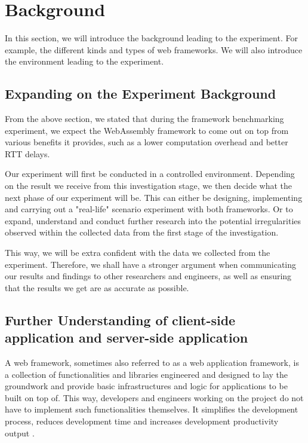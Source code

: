 \chapter{Background} \label{chap:background}

In this section, we will introduce the background leading to the experiment. For example, the different kinds and types of web frameworks. We will also introduce the environment leading to the experiment.

\section{Expanding on the Experiment Background}

From the above section, we stated that during the framework benchmarking experiment, we expect the WebAssembly framework to come out on top from various benefits it provides, such as a lower computation overhead and better RTT delays.

Our experiment will first be conducted in a controlled environment. Depending on the result we receive from this investigation stage, we then decide what the next phase of our experiment will be. This can either be designing, implementing and carrying out a "real-life" scenario experiment with both frameworks. Or to expand, understand and conduct further research into the potential irregularities observed within the collected data from the first stage of the investigation.

This way, we will be extra confident with the data we collected from the experiment. Therefore, we shall have a stronger argument when communicating our results and findings to other researchers and engineers, as well as ensuring that the results we get are as accurate as possible.

\section{Further Understanding of client-side application and server-side application}

A web framework, sometimes also referred to as a web application framework, is a collection of functionalities and libraries engineered and designed to lay the groundwork and provide basic infrastructures and logic for applications to be built on top of. This way, developers and engineers working on the project do not have to implement such functionalities themselves. It simplifies the development process, reduces development time and increases development productivity output \cite{exp11}.

